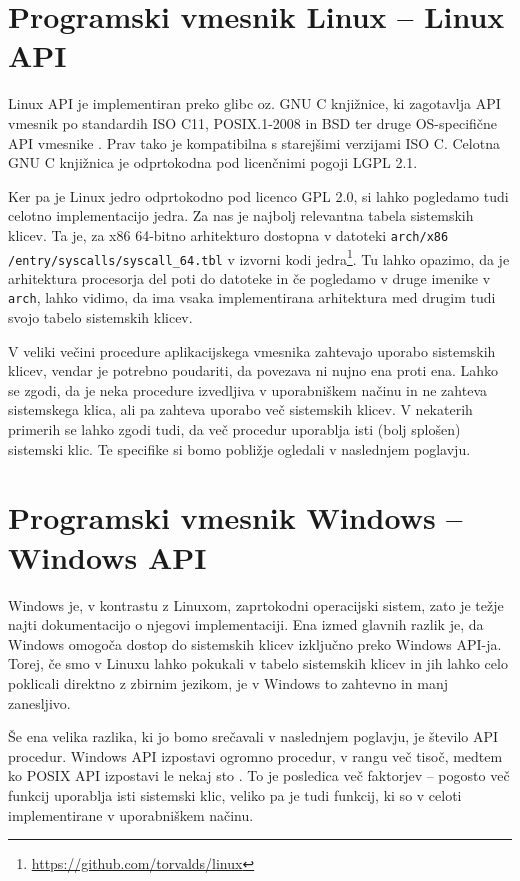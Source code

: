 \documentclass[a4paper,12pt,openright]{book}
\begin{document}
\section{Programski vmesnik Linux -- Linux API}

Linux API je implementiran preko glibc oz. GNU C knjižnice, ki zagotavlja API vmesnik po standardih ISO C11, POSIX.1-2008 in BSD ter druge OS-specifične API vmesnike \cite{GNU_Manual}.
Prav tako je kompatibilna s starejšimi verzijami ISO C.
Celotna GNU C knjižnica je odprtokodna pod licenčnimi pogoji LGPL 2.1.

Ker pa je Linux jedro odprtokodno pod licenco GPL 2.0, si lahko pogledamo tudi celotno implementacijo jedra.
Za nas je najbolj relevantna tabela sistemskih klicev.
Ta je, za x86 64-bitno arhitekturo dostopna v datoteki \texttt{arch/x86} \texttt{/entry/syscalls/syscall\_64.tbl} v izvorni kodi jedra\footnote{\url{https://github.com/torvalds/linux}}.
Tu lahko opazimo, da je arhitektura procesorja del poti do datoteke in če pogledamo v druge imenike v \texttt{arch}, lahko vidimo, da ima vsaka implementirana arhitektura med drugim tudi svojo tabelo sistemskih klicev.

V veliki večini procedure aplikacijskega vmesnika zahtevajo uporabo sistemskih klicev, vendar je potrebno poudariti, da povezava ni nujno ena proti ena.
Lahko se zgodi, da je neka procedure izvedljiva v uporabniškem načinu in ne zahteva sistemskega klica, ali pa zahteva uporabo več sistemskih klicev.
V nekaterih primerih se lahko zgodi tudi, da več procedur uporablja isti (bolj splošen) sistemski klic.
Te specifike si bomo pobližje ogledali v naslednjem poglavju.

\section{Programski vmesnik Windows -- Windows API} \label{sec:windows_api}

Windows je, v kontrastu z Linuxom, zaprtokodni operacijski sistem, zato je težje najti dokumentacijo o njegovi implementaciji.
Ena izmed glavnih razlik je, da Windows omogoča dostop do sistemskih klicev izključno preko Windows API-ja.
Torej, če smo v Linuxu lahko pokukali v tabelo sistemskih klicev in jih lahko celo poklicali direktno z zbirnim jezikom, je v Windows to zahtevno in manj zanesljivo.

Še ena velika razlika, ki jo bomo srečavali v naslednjem poglavju, je število API procedur.
Windows API izpostavi ogromno procedur, v rangu več tisoč, medtem ko POSIX API izpostavi le nekaj sto \cite{Tanenbaum_Bos_2023}.
To je posledica več faktorjev -- pogosto več funkcij uporablja isti sistemski klic, veliko pa je tudi funkcij, ki so v celoti implementirane v uporabniškem načinu.
\end{document}
